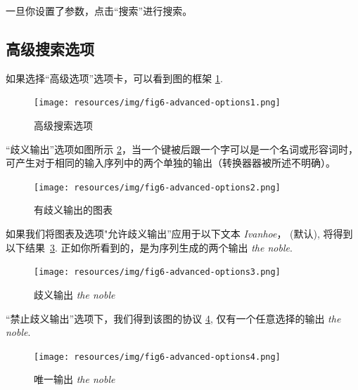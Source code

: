 \bigskip
\noindent
一旦你设置了参数，点击“搜索”进行搜索。


\subsection{高级搜索选项}
\label{section-advanced-search-options}
如果选择“高级选项”选项卡，可以看到图的框架 \ref{fig6-advanced-options1}.

\begin{figure}[!h]
\begin{center}
\texttt{[image: resources/img/fig6-advanced-options1.png]}
\caption{高级搜索选项\label{fig6-advanced-options1}}
\end{center}
\end{figure}

\bigskip
{}
\noindent “歧义输出”选项如图所示 \ref{fig6-advanced-options2}，当一个键被后跟一个字可以是一个名词或形容词时，可产生对于相同的输入序列中的两个单独的输出（转换器器被所述不明确）。

\bigskip
\begin{figure}[!h]
\begin{center}
\texttt{[image: resources/img/fig6-advanced-options2.png]}
\caption{有歧义输出的图表\label{fig6-advanced-options2}}
\end{center}
\end{figure}

\noindent 如果我们将图表及选项"允许歧义输出''应用于以下文本 \textit{Ivanhoe}，
(默认), 将得到以下结果~\ref{fig6-advanced-options3}. 正如你所看到的，是为序列生成的两个输出 \textit{the noble}.

\bigskip
\begin{figure}[!h]
\begin{center}
\texttt{[image: resources/img/fig6-advanced-options3.png]}
\caption{歧义输出 \textit{the noble}\label{fig6-advanced-options3}}
\end{center}
\end{figure}

“禁止歧义输出”选项下，我们得到该图的协议 \ref{fig6-advanced-options4},
仅有一个任意选择的输出 \textit{the noble}.

\bigskip
\begin{figure}[!h]
\begin{center}
\texttt{[image: resources/img/fig6-advanced-options4.png]}
\caption{唯一输出 \textit{the noble}\label{fig6-advanced-options4}}
\end{center}
\end{figure}

